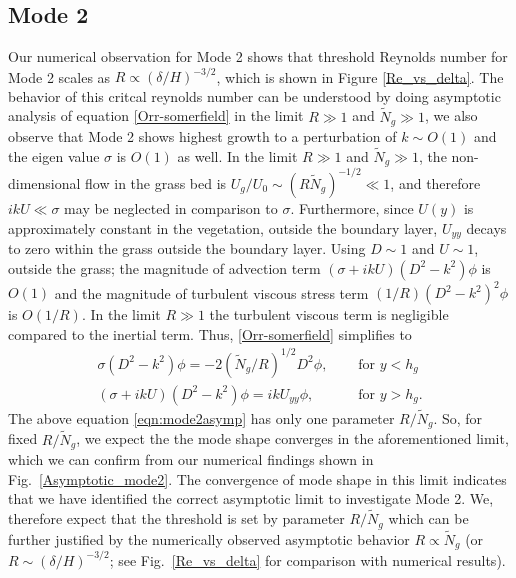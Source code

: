 \documentclass[12pt]{report}   %
\newcommand{\hg}{h_g}
\newcommand{\Rey}{{R}}
\newcommand{\Ndg}{\tilde{N}_g}
\begin{document}
\subsection{Mode 2}
Our numerical observation for Mode 2 shows that threshold Reynolds number for Mode 2 scales as $\Rey \propto ({\delta}/{H})^{-3/2}$, which is shown in Figure \ref{Re_vs_delta}. The behavior of this critcal reynolds number can be understood by doing asymptotic analysis of equation \ref{Orr-somerfield} in the limit $\Rey \gg 1$ and $\Ndg \gg 1$, we also observe that Mode 2 shows highest growth to a perturbation of $k \sim O(1)$ and the eigen value $\sigma$ is $O(1)$ as well. In the limit $\Rey \gg 1$ and $\Ndg \gg 1$, the non-dimensional flow in the grass bed is $U_g/U_0 \sim (\Rey \Ndg)^{-1/2} \ll 1$, and therefore $ikU \ll \sigma$ may be neglected in comparison to $\sigma$. Furthermore, since $U(y)$ is approximately constant in the vegetation, outside the boundary layer, $U_{yy}$ decays to zero within the grass outside the boundary layer. Using $D\sim 1$ and $U \sim 1$, outside the grass; the magnitude of advection term $\left(\sigma + i k U\right)\left(D^2- k^2\right) \phi$ is $O(1)$ and the magnitude of 
turbulent viscous stress term $(1/\Rey)\left(D^2-k^2\right)^2\phi$ is $O(1/R)$. In the limit $\Rey \gg 1$ the turbulent viscous term is negligible compared to the inertial term.
Thus, \eqref{Orr-somerfield} simplifies to 
\begin{subequations}
\begin{align}
\sigma\left(D^2-k^2\right)\phi = -2{(\Ndg/\Rey)^{1/2}}D^2\phi,  \quad &\text{ for } y<\hg  \label{eqn:mode2asympa} \\
\left(\sigma+ikU\right) \left(D^2-k^2\right)\phi =  ikU_{yy}\phi, \quad &\text{ for } y>\hg. \label{eqn:mode2asympb}
\end{align}
\label{eqn:mode2asymp}
\end{subequations}
The above equation \eqref{eqn:mode2asymp} has only one parameter $\Rey/\Ndg$. 
So, for fixed $\Rey/\Ndg$, we expect the the mode shape converges in the aforementioned limit, which we can confirm from our numerical findings shown in Fig.~\ref{Asymptotic_mode2}. The convergence of mode shape in this limit indicates that we have identified the correct asymptotic limit to investigate Mode 2. We, therefore expect that the  threshold is set by parameter $\Rey/\Ndg$ which can be further justified by the numerically observed asymptotic behavior $\Rey \propto \Ndg$ (or $\Rey \sim ({\delta}/{H})^{-3/2}$; see Fig.~\ref{Re_vs_delta} for comparison with numerical results).
\end{document}
